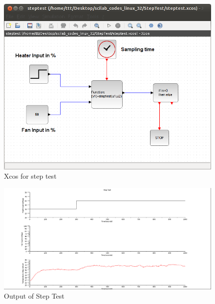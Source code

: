 \begin{figure}
\centering
\includegraphics[width=0.7\linewidth]{vlabs/step-xcos.png}
\caption{Xcos for step test}
\label{step-xcos}
\end{figure}

\begin{figure}
\centering
\includegraphics[width=0.7\linewidth]{vlabs/step-test-output.png}
\caption{Output of Step Test}
\label{step-plot}
\end{figure}



